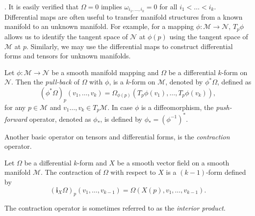 . It is easily verified that $\Omega = 0$ implies $\omega_{i_1,\dots,i_k} = 0$ for all $i_1<\dots<i_k$. Differential maps are often useful to transfer manifold structures from a known manifold to an unknown manifold. For example, for a mapping $\phi:\mathcal M \to \mathcal N$, $T_p\phi$ allows us to identify the tangent space of $\mathcal N$ at $\phi(p)$ using the tangent space of $\mathcal M$ at $p$. Similarly, we may use the differential maps to construct differential forms and tensors for unknown manifolds. 

\begin{definition}
Let $\phi:\mathcal M \to \mathcal N$ be a smooth manifold mapping and $\Omega$ be a differential $k$-form on $\mathcal N$. Then the \emph{pull-back} of $\Omega$ with $\phi$, is a $k$-form on $\mathcal M$, denoted by $\phi^*\Omega$, defined as
\[
	(\phi^*\Omega)_p(v_1,\dots,v_k) = \Omega_{\phi(p)}( T_p\phi(v_1) , \dots , T_p\phi(v_k) ),
\]
for any $p\in \mathcal M$ and $v_1\dots,v_k \in T_p \mathcal M$. In case $\phi$ is a diffeomorphism, the \emph{push-forward} operator, denoted as $\phi_*$, is defined by $\phi_* = (\phi^{-1})^*$.
\end{definition}

Another basic operator on tensors and differential forms, is the \emph{contraction} operator.
\begin{definition}
	Let $\Omega$ be a differential $k$-form and $X$ be a smooth vector field on a smooth manifold $\mathcal M$. The contraction of $\Omega$ with respect to $X$ is a $(k-1)$-form defined by
\[
	(\mathbf i_{X}\Omega)_p(v_1,\dots,v_{k-1}) = \Omega(X(p),v_1,\dots,v_{k-1}).
\]
\end{definition}
The contraction operator is sometimes referred to as the \emph{interior product}.

